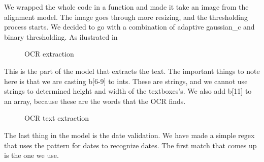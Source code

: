 We wrapped the whole code in a function and made it take an image from the alignment model.
The image goes through more resizing, and the thresholding process starts.
We decided to go with a combination of adaptive gaussian\_c and binary thresholding.
As ilustrated in


\begin{figure}[h]
    \caption{OCR extraction}
    \label{fig:OCR text extraction}
\end{figure}

This is the part of the model that extracts the text.
The important things to note here is that we are casting b[6-9] to ints.
These are strings, and we cannot use strings to determined height and width of the textboxes's.
We also add b[11] to an array, because these are the words that the OCR finds.

\clearpage

\begin{figure}[h]
    \caption{OCR text extraction}
    \label{fig:OCR date extraction}
\end{figure}

The last thing in the model is the date validation.
We have made a simple regex that uses the pattern for dates to recognize dates.
The first match that comes up is the one we use.

